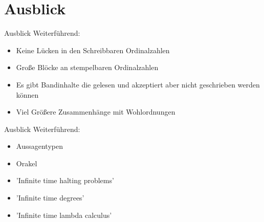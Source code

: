 \section{Ausblick}

\begin{frame}[c]{Ausblick}
    \large
    Weiterführend:
    \begin{itemize}
        \item Keine Lücken in den Schreibbaren Ordinalzahlen
        \item Große Blöcke an stempelbaren Ordinalzahlen
            \pause
        \item Es gibt Bandinhalte die gelesen und akzeptiert aber nicht geschrieben werden können
        \item Viel Größere Zusammenhänge mit Wohlordnungen
    \end{itemize}
\end{frame}


\begin{frame}[c]{Ausblick}
    \Large
    Weiterführend:
    \begin{itemize}
        \item Aussagentypen
        \item Orakel
            \pause
        \item 'Infinite time halting problems'
        \item 'Infinite time degrees'
        \item 'Infinite time lambda calculus'
    \end{itemize}
\end{frame}


